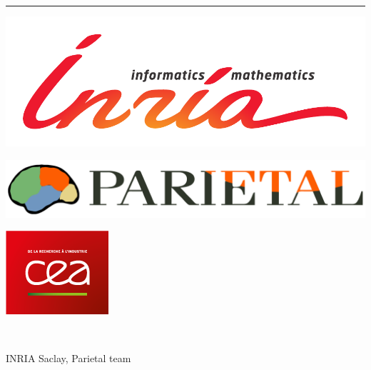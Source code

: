 \documentclass{article}
\begin{document}
\bigskip
\pagestyle{empty}
\vspace*{-3em}
\hrule
    \begin{minipage}{.23\linewidth}
	\hspace*{-2ex}%
	\includegraphics[width=\linewidth]{../logo_inria_couleur}
    \end{minipage}%
    \hfill%
    \begin{minipage}{.2\linewidth}
	\includegraphics[width=\linewidth]{../logo_parietal}
    \end{minipage}%
    \hfill%
    \begin{minipage}{.15\linewidth}
	\includegraphics[width=\linewidth]{../logo_cea}
    \end{minipage}%
    \\
    \begin{minipage}{.6\linewidth}
	\sf
	INRIA Saclay, \qquad\qquad
	Parietal team~
	\small{}
    \end{minipage}
\end{document}
